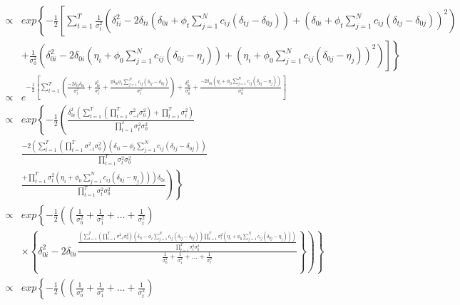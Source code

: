 \documentclass[12pt,a4paper]{article}
\begin{document}
\begin{CJK}{UTF8}{bkai}
\begin{align*}
 \propto &
exp\left\{-\frac{1}{2}\left[\sum_{t=1}^T\frac{1}{\sigma_t^2}\left(\delta_{ti}^2-2\delta_{ti}\left(\delta_{0i}+\phi_t\sum_{j=1}^N c_{ij}(\delta_{tj}-\delta_{0j})\right)+\left(\delta_{0i}+\phi_t\sum_{j=1}^N c_{ij}(\delta_{tj}-\delta_{0j})\right)^2\right) \right.\right. \\[3mm]
 & \left.\left.+\frac{1}{\sigma_0^2}\left(\delta_{0i}^2-2\delta_{0i}\left(\eta_i+\phi_0\sum_{j=1}^N c_{ij}(\delta_{0j}-\eta_j)\right)+\left(\eta_i+\phi_0\sum_{j=1}^N c_{ij}(\delta_{0j}-\eta_j)\right)^2\right)\right]\right\} \\[3mm]
 \propto &
e^{-\frac{1}{2}\left[\sum_{t=1}^T\left(\frac{-2\delta_{ti}\delta_{0i}}{\sigma_t^2}+\frac{\delta_{0i}^2}{\sigma_t^2}+\frac{2\delta_{0i}\phi_t\sum_{j=1}^N c_{ij}(\delta_{tj}-\delta_{0j})}{\sigma_t^2}\right)+\frac{\delta_{0i}^2}{\sigma_0^2}+\frac{-2\delta_{0i}\left(\eta_i+\phi_0\sum_{j=1}^N c_{ij}(\delta_{0j}-\eta_j)\right)}{\sigma_0^2}\right]} \\[3mm]
 \propto &
exp\left\{-\frac{1}{2}\left(\frac{\delta_{0i}^2\left(\sum_{t=1}^T\left(\prod_{t=1}^T\sigma_{-t}^2\sigma_0^2\right)+\prod_{t=1}^T\sigma_t^2\right)}{\prod_{t=1}^T\sigma_t^2\sigma_0^2} \right.\right. \\[3mm]
& \left. \left. \frac{-2\left(\sum_{t=1}^T\left(\prod_{t=1}^T\sigma_{-t}^2\sigma_0^2\right)\left(\delta_{ti}-\phi_t\sum_{j=1}^N c_{ij}(\delta_{tj}-\delta_{0j})\right)\right.}{\prod_{t=1}^T\sigma_t^2\sigma_0^2}\right.\right. \\[3mm]
& \left.\left. \frac{\left.+\prod_{t=1}^T\sigma_t^2\left(\eta_i+\phi_0\sum_{j=1}^N c_{ij}(\delta_{0j}-\eta_j)\right)\right)\delta_{0i}}{\prod_{t=1}^T\sigma_t^2\sigma_0^2}\right)\right\} \\[3mm]
 \propto &
exp\left\{-\frac{1}{2}\left(\left(\frac{1}{\sigma_0^2}+\frac{1}{\sigma_1^2}+\dots+\frac{1}{\sigma_t^2}\right)\right.\right.\\[3mm]
& \left.\left. \times \left\{\delta_{0i}^2-2\delta_{0i}\frac{\frac{\left(\sum_{t=1}^T\left(\prod_{t=1}^T\sigma_{-t}^2\sigma_0^2\right)\left(\delta_{ti}-\phi_t\sum_{j=1}^N c_{ij}(\delta_{tj}-\delta_{0j})\right)\prod_{t=1}^T\sigma_t^2\left(\eta_i+\phi_0\sum_{j=1}^N c_{ij}(\delta_{0j}-\eta_j)\right)\right)}{\prod_{t=1}^T\sigma_t^2\sigma_0^2}}{\frac{1}{\sigma_0^2}+\frac{1}{\sigma_1^2}+\dots+\frac{1}{\sigma_t^2}}\right\}\right)\right\}
\\[3mm]
 \propto &
 exp\left\{-\frac{1}{2}\left(\left(\frac{1}{\sigma_0^2}+\frac{1}{\sigma_1^2}+\dots+\frac{1}{\sigma_t^2}\right)\right.\right.\\[3mm]

\end{align*}
\end{CJK}
\end{document}
